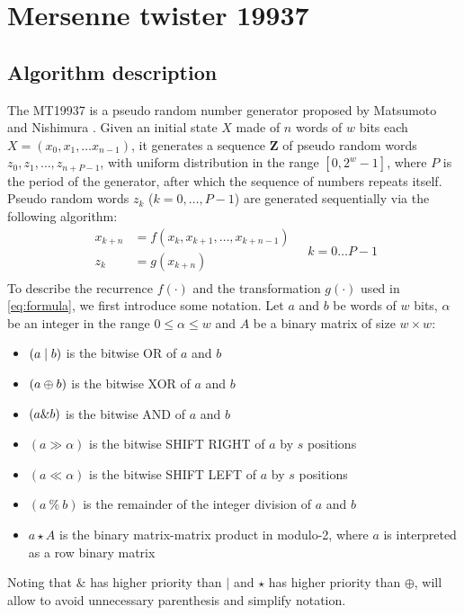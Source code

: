 \documentclass[preprint,1p,times]{elsarticle}
\begin{document}
	\section{Mersenne twister 19937}
	\label{sec:mt19937}
	\subsection{Algorithm description}
	The MT19937 is a pseudo random number generator proposed by Matsumoto and Nishimura \cite{mt19937}.
	Given an initial state $X$ made of $n$ words of $w$ bits each $X=(x_0, x_1, \dots x_{n-1})$, it generates a sequence $\boldsymbol{Z}$ of pseudo random words $z_{0}, z_{1}, \dots, z_{n+P-1}$, with uniform distribution in the range $[0, 2^w-1]$, where $P$ is the period of the generator, after which the sequence of numbers repeats itself. Pseudo random words $z_k$ ($k=0, \dots, P-1$) are generated sequentially via the following algorithm:
	\begin{equation}
		\label{eq:formula}
		\begin{aligned}
			x_{k+n} &= f(x_{k}, x_{k+1},\dots, x_{k+n-1}) \\
			z_k &= g(x_{k+n}) \\
		\end{aligned}
		\quad k=0\dots P-1
	\end{equation}
	To describe the recurrence $f(\cdot)$ and the transformation $g(\cdot)$ used in \eqref{eq:formula}, we first introduce some notation. Let $a$ and $b$ be words of $w$ bits, $\alpha$ be an integer in the range $0\le \alpha \le w$ and $A$ be a binary matrix of size $w \times w$:
	\begin{itemize}
		\item $(a \mid b)$ is the bitwise OR of $a$ and $b$
		\item $(a \mathbin{\oplus} b)$ is the bitwise XOR of $a$ and $b$
		\item $(a \& b)$ is the bitwise AND of $a$ and $b$
		\item $(a \gg \alpha)$ is the bitwise SHIFT RIGHT of $a$ by $s$ positions
		\item $(a \ll \alpha)$ is the bitwise SHIFT LEFT of $a$ by $s$ positions
		\item $(a~\%~b)$ is the remainder of the integer division of $a$ and $b$
		\item $a \star A$ is the binary matrix-matrix product in modulo-2, where $a$ is interpreted as a row binary matrix
	\end{itemize}
	Noting that $\&$ has higher priority than $\mid$ and $\star$ has higher priority than $\oplus$, will allow to avoid unnecessary parenthesis and simplify notation.
\end{document}
